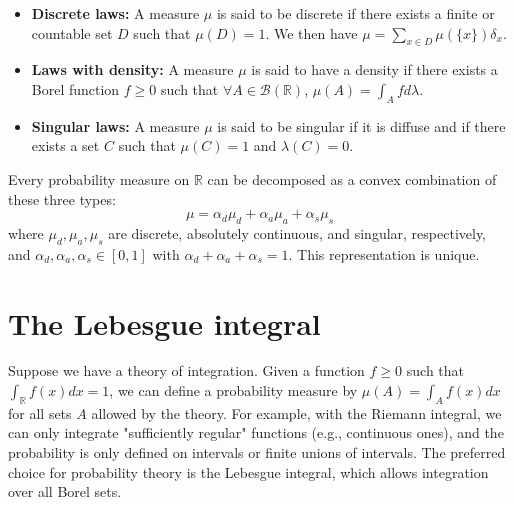 \begin{itemize}
    \item \textbf{Discrete laws:} A measure $\mu$ is said to be discrete if there exists a finite or countable set $D$ such that $\mu(D) = 1$. We then have $\mu = \sum_{x \in D} \mu(\{x\}) \delta_x$.
    \item \textbf{Laws with density:} A measure $\mu$ is said to have a density if there exists a Borel function $f \ge 0$ such that $\forall A \in \mathcal{B}(\mathbb{R})$, $\mu(A) = \int_A f d\lambda$.
    \item \textbf{Singular laws:} A measure $\mu$ is said to be singular if it is diffuse and if there exists a set $C$ such that $\mu(C)=1$ and $\lambda(C)=0$.
\end{itemize}
Every probability measure on $\mathbb{R}$ can be decomposed as a convex combination of these three types:
\[
\mu = \alpha_d \mu_d + \alpha_a \mu_a + \alpha_s \mu_s
\]
where $\mu_d, \mu_a, \mu_s$ are discrete, absolutely continuous, and singular, respectively, and $\alpha_d, \alpha_a, \alpha_s \in [0,1]$ with $\alpha_d + \alpha_a + \alpha_s = 1$. This representation is unique.%
\section{The Lebesgue integral}%
Suppose we have a theory of integration. Given a function $f \ge 0$ such that $\int_{\mathbb{R}} f(x) dx = 1$, we can define a probability measure by $\mu(A) = \int_A f(x) dx$ for all sets $A$ allowed by the theory.
For example, with the Riemann integral, we can only integrate "sufficiently regular" functions (e.g., continuous ones), and the probability is only defined on intervals or finite unions of intervals.
The preferred choice for probability theory is the Lebesgue integral, which allows integration over all Borel sets.%
